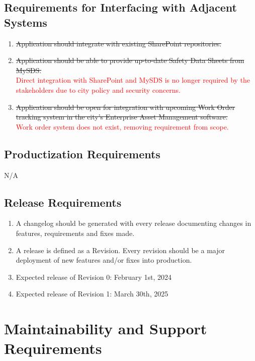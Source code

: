 \documentclass[12pt]{article}
\begin{document}
\subsection{Requirements for Interfacing with Adjacent Systems}
\begin{enumerate} [{OE-IAS}1.]
  \item \sout{Application should integrate with existing SharePoint
    repositories.}
  \item \sout{Application should be able to provide up-to-date Safety Data
    Sheets from MySDS.}\\
    \textcolor{red}{Direct integration with SharePoint and MySDS is
      no longer required by the stakeholders due to city policy and
    security concerns.}
  \item \sout{Application should be open for integration with upcoming Work
    Order tracking system in the city's Enterprise Asset Management software.}\\
    \textcolor{red}{Work order system does not exist, removing
    requirement from scope.}
\end{enumerate}
\subsection{Productization Requirements}
N/A
\subsection{Release Requirements}
\begin{enumerate} [{OE-REL}1.]
  \item A changelog should be generated with every release
    documenting changes in features, requirements and fixes made.
  \item A release is defined as a Revision. Every revision should be
    a major deployment of new features and/or fixes into production.
  \item Expected release of Revision 0: February 1st, 2024
  \item Expected release of Revision 1: March 30th, 2025
\end{enumerate}

\section{Maintainability and Support Requirements}
\end{document}
